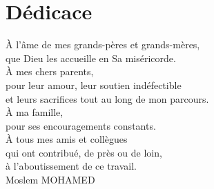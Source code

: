 \section*{Dédicace}

\vspace*{2.5cm}

\begin{flushright}
\begin{minipage}{0.72\textwidth}
\raggedleft\itshape

À l'âme de mes grands-pères et grands-mères,\\
que Dieu les accueille en Sa miséricorde.\\[1cm]

À mes chers parents,\\
pour leur amour, leur soutien indéfectible\\
et leurs sacrifices tout au long de mon parcours.\\[1cm]

À ma famille,\\
pour ses encouragements constants.\\[1cm]

À tous mes amis et collègues\\
qui ont contribué, de près ou de loin,\\
à l'aboutissement de ce travail.\\[1cm]

\upshape\normalsize Moslem MOHAMED

\end{minipage}
\end{flushright}

\vfill
